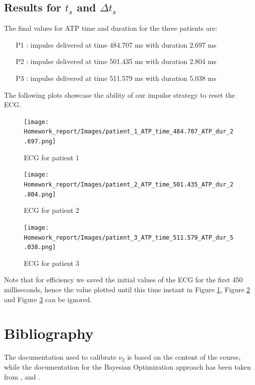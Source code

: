 \documentclass[11pt,a4paper]{article}
\begin{document}
\subsection{Results for $t_s$ and $\Delta t_s$}
The final values for ATP time and duration for the three patients are:

\begin{itemize}
    \item [P1]: impulse delivered at time 484.707 ms with duration  2.697 ms
    \item [P2]: impulse delivered at time 501.435 ms with duration 2.804 ms
    \item [P3]: impulse delivered at time 511.579 ms with duration 5.038 ms
\end{itemize}
 
The following plots showcase the ability of our impulse strategy to reset the ECG.

\begin{figure}[H]
\begin{center}
\texttt{[image: Homework\_report/Images/patient\_1\_ATP\_time\_484.707\_ATP\_dur\_2.697.png]}
    \caption{ECG for patient 1}
    \label{ecgp1}
\end{center}
\end{figure}

\begin{figure}[H]
\begin{center}
\texttt{[image: Homework\_report/Images/patient\_2\_ATP\_time\_501.435\_ATP\_dur\_2.804.png]}
    \caption{ECG for patient 2}
    \label{ecgp2}
\end{center}
\end{figure}

\begin{figure}[H]
\begin{center}
\texttt{[image: Homework\_report/Images/patient\_3\_ATP\_time\_511.579\_ATP\_dur\_5.038.png]}
    \caption{ECG for patient 3}
    \label{ecgp3}
\end{center}
\end{figure}

Note that for efficiency we saved the initial values of the ECG for the first 450 milliseconds, hence the value plotted until this time instant in Figure \ref{ecgp1}, Figure \ref{ecgp2} and Figure \ref{ecgp3} can be ignored.

\section{Bibliography}
The documentation used to calibrate $\nu_2$ is based on the content of the course, while the documentation for the Bayesian Optimization approach has been taken from \cite{bayesopt_1}, \cite{baysopt_git} and \cite{bayesopt_2}.
\end{document}
